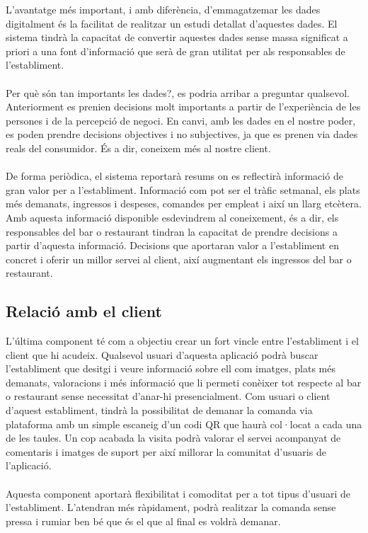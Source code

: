 L'avantatge més important, i amb diferència, d'emmagatzemar les dades digitalment és la facilitat de realitzar un estudi detallat d'aquestes dades. El sistema tindrà la capacitat de convertir aquestes dades sense massa significat a priori a una font d'informació que serà de gran utilitat per als responsables de l'establiment.
\\\\
Per què són tan importants les dades?, es podria arribar a preguntar qualsevol. Anteriorment es prenien decisions molt importants a partir de l'experiència de les persones i de la percepció de negoci. En canvi, amb les dades en el nostre poder, es poden prendre decisions objectives i no subjectives, ja que es prenen via dades reals del consumidor. És a dir, coneixem més al nostre client.
\\\\
De forma periòdica, el sistema reportarà resums on es reflectirà informació de gran valor per a l'establiment. Informació com pot ser el tràfic setmanal, els plats més demanats, ingressos i despeses, comandes per empleat i així un llarg etcètera. Amb aquesta informació disponible esdevindrem al coneixement, és a dir, els responsables del bar o restaurant tindran la capacitat de prendre decisions a partir d'aquesta informació. Decisions que aportaran valor a l'establiment en concret i oferir un millor servei al client, així augmentant els ingressos del bar o restaurant.

\subsection{Relació amb el client}

L'última component té com a objectiu crear un fort vincle entre l'establiment i el client que hi acudeix. Qualsevol usuari d'aquesta aplicació podrà buscar l'establiment que desitgi i veure informació sobre ell com imatges, plats més demanats, valoracions i més informació que li permeti conèixer tot respecte al bar o restaurant sense necessitat d'anar-hi presencialment. Com usuari o client d'aquest establiment, tindrà la possibilitat de demanar la comanda via plataforma amb un simple escaneig d'un codi QR que haurà col·locat a cada una de les taules. Un cop acabada la visita podrà valorar el servei acompanyat de comentaris i imatges de suport per així millorar la comunitat d'usuaris de l'aplicació.
\\\\
Aquesta component aportarà flexibilitat i comoditat per a tot tipus d'usuari de l'establiment. L'atendran més ràpidament, podrà realitzar la comanda sense pressa i rumiar ben bé que és el que al final es voldrà demanar.


